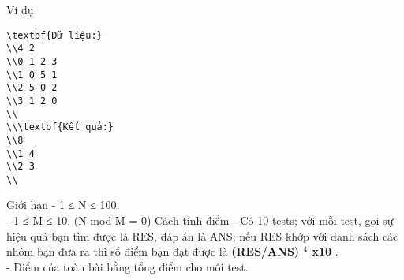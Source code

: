 Ví dụ  
\begin{verbatim}
\textbf{Dữ liệu:}
\\4 2
\\0 1 2 3
\\1 0 5 1
\\2 5 0 2
\\3 1 2 0
\\
\\\textbf{Kết quả:}
\\8
\\1 4
\\2 3
\\\end{verbatim}
   Giới hạn  
- 1 ≤ N ≤ 100.   
\\   - 1 ≤ M ≤ 10. (N mod M = 0)
   Cách tính điểm  
- Có 10 tests; với mỗi test, gọi sự hiệu quả bạn tìm được là RES, đáp án là ANS; nếu RES khớp với danh sách các nhóm bạn đưa ra thì số điểm bạn đạt được là   \textbf{    (RES/ANS)    $^     4    $    x10   }   .   
\\   - Điểm của toàn bài bằng tổng điểm cho mỗi test.